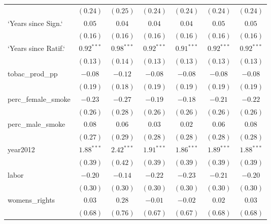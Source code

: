 \begin{table}[!h]
\begin{center}
\begin{tabular}{l c c c c c c }
                        & $(0.24)$     & $(0.25)$     & $(0.24)$     & $(0.24)$     & $(0.24)$     & $(0.24)$     \\
`Years since Sign.`     & $0.05$       & $0.04$       & $0.04$       & $0.04$       & $0.05$       & $0.05$       \\
                        & $(0.16)$     & $(0.16)$     & $(0.16)$     & $(0.16)$     & $(0.16)$     & $(0.16)$     \\
`Years since Ratif.`    & $0.92^{***}$ & $0.98^{***}$ & $0.92^{***}$ & $0.91^{***}$ & $0.92^{***}$ & $0.92^{***}$ \\
                        & $(0.13)$     & $(0.14)$     & $(0.13)$     & $(0.13)$     & $(0.13)$     & $(0.13)$     \\
tobac\_prod\_pp         & $-0.08$      & $-0.12$      & $-0.08$      & $-0.08$      & $-0.08$      & $-0.08$      \\
                        & $(0.19)$     & $(0.18)$     & $(0.19)$     & $(0.19)$     & $(0.19)$     & $(0.19)$     \\
perc\_female\_smoke     & $-0.23$      & $-0.27$      & $-0.19$      & $-0.18$      & $-0.21$      & $-0.22$      \\
                        & $(0.26)$     & $(0.28)$     & $(0.26)$     & $(0.26)$     & $(0.26)$     & $(0.26)$     \\
perc\_male\_smoke       & $0.08$       & $0.06$       & $0.03$       & $0.02$       & $0.06$       & $0.08$       \\
                        & $(0.27)$     & $(0.29)$     & $(0.28)$     & $(0.28)$     & $(0.28)$     & $(0.28)$     \\
year2012                & $1.88^{***}$ & $2.42^{***}$ & $1.91^{***}$ & $1.86^{***}$ & $1.89^{***}$ & $1.88^{***}$ \\
                        & $(0.39)$     & $(0.42)$     & $(0.39)$     & $(0.39)$     & $(0.39)$     & $(0.39)$     \\
labor                   & $-0.20$      & $-0.14$      & $-0.22$      & $-0.23$      & $-0.21$      & $-0.20$      \\
                        & $(0.30)$     & $(0.30)$     & $(0.30)$     & $(0.30)$     & $(0.30)$     & $(0.30)$     \\
womens\_rights          & $0.03$       & $0.28$       & $-0.01$      & $-0.02$      & $0.02$       & $0.03$       \\
                        & $(0.68)$     & $(0.76)$     & $(0.67)$     & $(0.67)$     & $(0.68)$     & $(0.68)$     \\

\end{tabular}
\end{center}
\end{table}
